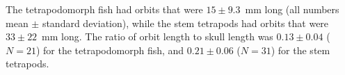  The tetrapodomorph fish had orbits that were $15 \pm 9.3$~mm long (all numbers mean $\pm$ standard deviation), while the stem tetrapods had orbits that were $33 \pm 22$~mm long. The ratio of orbit length to skull length was $0.13 \pm 0.04$  ($N=21$) for the tetrapodomorph fish, and $0.21 \pm  0.06$ ($N=31$) for the stem tetrapods.